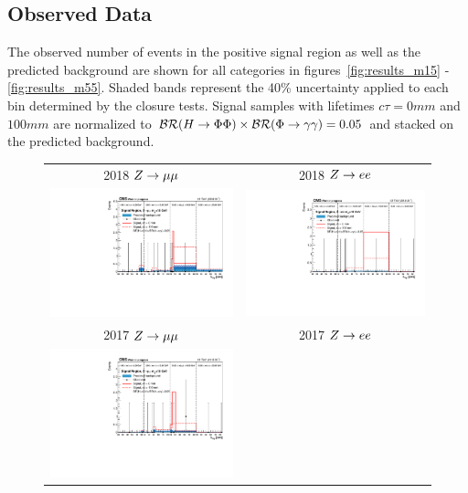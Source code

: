 \subsection{Observed Data} \label{sec:ana_obs}
The observed number of events in the positive \lxy signal region as well as the predicted background are shown for all categories in figures~\ref{fig:results_m15} - \ref{fig:results_m55}. Shaded bands represent the 40\% uncertainty applied to each bin determined by the closure tests. Signal samples with lifetimes $c\tau=0\unit{mm}$ and $100\unit{mm}$ are normalized to $\mathcal{BR}(H\to\Phi\Phi)\times\mathcal{BR}(\Phi\to\gamma\gamma)=0.05$ and stacked on the predicted background.

\begin{figure}[htb!]
	\centering
	\begin{tabular}{c c}
		2018 $Z\to\mu\mu$ & 2018 $Z\to ee$\\
		\includegraphics[width=0.45\linewidth]{figs/05_analysis/closure_ZH_MU_m15_data_2018.pdf} &
		\includegraphics[width=0.45\linewidth]{figs/05_analysis/closure_ZH_ELE_m15_data_2018.pdf} \\
		2017 $Z\to\mu\mu$ & 2017 $Z\to ee$\\
		\includegraphics[width=0.45\linewidth]{figs/05_analysis/closure_ZH_MU_m15_data_2017.pdf} &

\end{tabular}
\end{figure}
